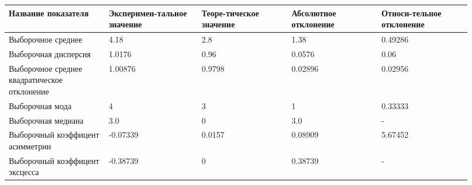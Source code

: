 \begin{center}
\begin{tabular}{|p{0.2\linewidth}|p{0.18\linewidth}|p{0.18\linewidth}|p{0.18\linewidth}|p{0.18\linewidth}|}\hline
Название показателя & Эксперимен{-}тальное значение & Теоре{-}тическое значение & Абсолютное отклонение & Относи{-}тельное отклонение\\\hline
Выборочное среднее & 4.18 & 2.8 & 1.38 & 0.49286 \\\hline
Выборочная дисперсия & 1.0176 & 0.96 & 0.0576 & 0.06 \\\hline
Выборочное среднее\newline
квадратическое отклонение & 1.00876 & 0.9798 & 0.02896 & 0.02956 \\\hline
Выборочная мода & 4 & 3 & 1 & 0.33333 \\\hline
Выборочная медиана & 3.0 & 0 & 3.0 & - \\\hline
Выборочный коэффицент асимметрии & -0.07339 & 0.0157 & 0.08909 & 5.67452 \\\hline
Выборочный коэффицент эксцесса & -0.38739 & 0 & 0.38739 & - \\\hline
\end{tabular}
\end{center}

